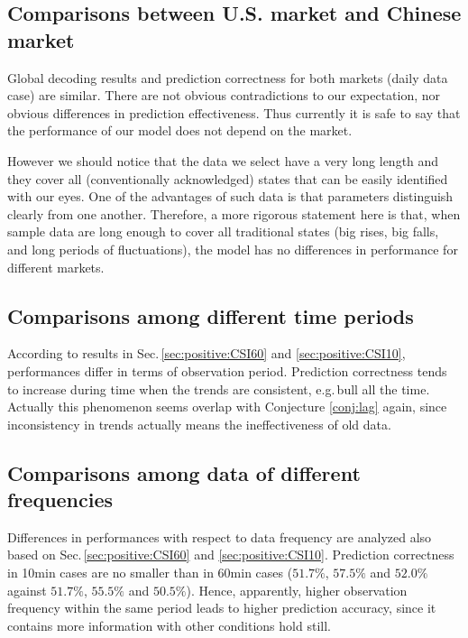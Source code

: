\subsection{Comparisons between U.S. market and Chinese market}
\label{sec:positive:result:market}
Global decoding results and prediction correctness 
for both markets (daily data case) are similar.
There are not obvious contradictions to our expectation,
nor obvious differences in prediction effectiveness.
Thus currently it is safe to say that the performance of our model does not depend on the market.

However we should notice that the data we select have a very long length 
and they cover all (conventionally acknowledged) states that can be easily identified with our eyes.
One of the advantages of such data is that parameters distinguish clearly from one another.
Therefore, a more rigorous statement here is that,
when sample data are long enough to cover all traditional states 
(big rises, big falls, and long periods of fluctuations),
the model has no differences in performance for different markets.


\subsection{Comparisons among different time periods}
\label{sec:positive:result:time}
According to results in Sec.\,\ref{sec:positive:CSI60} and \ref{sec:positive:CSI10},
performances differ in terms of observation period.
Prediction correctness tends to increase during time when the trends are consistent,
e.g.\,bull all the time.
Actually this phenomenon seems overlap with Conjecture \ref{conj:lag} again, 
since inconsistency in trends actually means the ineffectiveness of old data.


\subsection{Comparisons among data of different frequencies}
\label{sec:positive:result:frequency}
Differences in performances with respect to data frequency are analyzed 
also based on Sec.\,\ref{sec:positive:CSI60} and \ref{sec:positive:CSI10}.
Prediction correctness in 10min cases are no smaller than in 60min cases 
($51.7\%$, $57.5\%$ and $52.0\%$ against $51.7\%$, $55.5\%$ and $50.5\%$).
Hence, apparently, higher observation frequency within the same period
leads to higher prediction accuracy,
since it contains more information with other conditions hold still.

